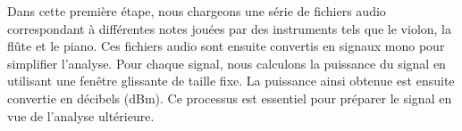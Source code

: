 Dans cette première étape, nous chargeons une série de fichiers audio correspondant à différentes notes jouées par des instruments tels que le violon, la flûte et le piano. Ces fichiers audio sont ensuite convertis en signaux mono pour simplifier l'analyse. Pour chaque signal, nous calculons la puissance du signal en utilisant une fenêtre glissante de taille fixe. La puissance ainsi obtenue est ensuite convertie en décibels (dBm). Ce processus est essentiel pour préparer le signal en vue de l'analyse ultérieure. 